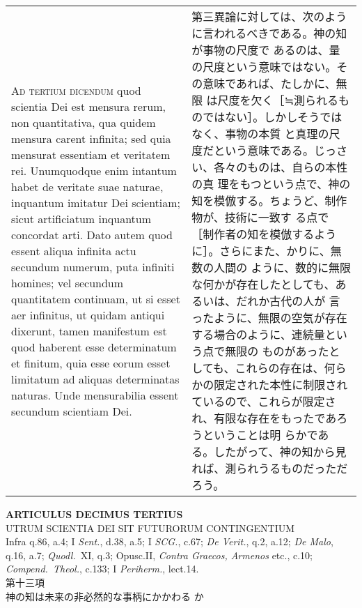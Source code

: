 \documentclass[10pt]{jsarticle} %
\begin{document}
\begin{longtable}{p{21em}p{21em}}
\\


{\scshape Ad tertium dicendum} quod scientia Dei est mensura rerum,
non quantitativa, qua quidem mensura carent infinita; sed quia
mensurat essentiam et veritatem rei. Unumquodque enim intantum habet
de veritate suae naturae, inquantum imitatur Dei scientiam; sicut
artificiatum inquantum concordat arti. Dato autem quod essent aliqua
infinita actu secundum numerum, puta infiniti homines; vel secundum
quantitatem continuam, ut si esset aer infinitus, ut quidam antiqui
dixerunt, tamen manifestum est quod haberent esse determinatum et
finitum, quia esse eorum esset limitatum ad aliquas determinatas
naturas. Unde mensurabilia essent secundum scientiam Dei.


&

第三異論に対しては、次のように言われるべきである。神の知が事物の尺度で
あるのは、量の尺度という意味ではない。その意味であれば、たしかに、無限
は尺度を欠く［≒測られるものではない］。しかしそうではなく、事物の本質
と真理の尺度だという意味である。じっさい、各々のものは、自らの本性の真
理をもつという点で、神の知を模倣する。ちょうど、制作物が、技術に一致す
る点で［制作者の知を模倣するように］。さらにまた、かりに、無数の人間の
ように、数的に無限な何かが存在したとしても、あるいは、だれか古代の人が
言ったように、無限の空気が存在する場合のように、連続量という点で無限の
ものがあったとしても、これらの存在は、何らかの限定された本性に制限され
ているので、これらが限定され、有限な存在をもったであろうということは明
らかである。したがって、神の知から見れば、測られうるものだっただろう。



\end{longtable}
\newpage



\begin{center}
{\Large {\bf ARTICULUS DECIMUS TERTIUS}}\\ {\large UTRUM SCIENTIA DEI
SIT FUTURORUM CONTINGENTIUM}\\ {\footnotesize Infra q.86, a.4; I
{\itshape Sent.}, d.38, a.5; I {\itshape SCG.}, c.67; {\itshape De
Verit.}, q.2, a.12; {\itshape De Malo}, q.16, a.7; {\itshape
Quodl.}~XI, q.3; Opusc.II, {\itshape Contra Graecos, Armenos} etc.,
c.10; {\itshape Compend.~Theol.}, c.133; I {\itshape Periherm.},
lect.14.}\\ {\Large 第十三項\\神の知は未来の非必然的な事柄にかかわる
か}
\end{center}
\end{document}
